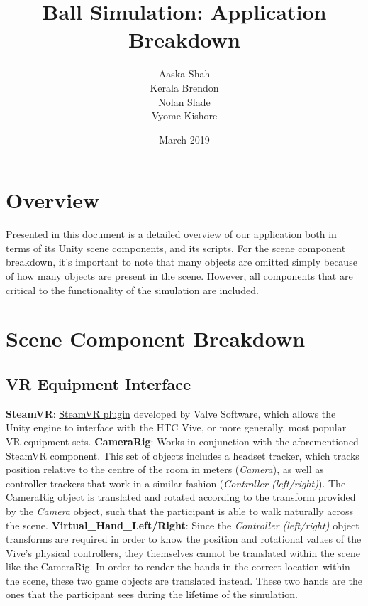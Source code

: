 \documentclass{article}
\title{Ball Simulation: Application Breakdown}
\author{Aaska Shah\\Kerala Brendon\\Nolan Slade\\Vyome Kishore}
\date{March 2019}
\begin{document}
\maketitle

\section*{Overview}
Presented in this document is a detailed overview of our application both in terms of its Unity scene components, and its scripts. For the scene component breakdown, it's important to note that many objects are omitted simply because of how many objects are present in the scene. However, all components that are critical to the functionality of the simulation are included.


\section*{Scene Component Breakdown}
\subsection*{VR Equipment Interface}
\textbf{SteamVR}: \href{https://bit.ly/2VnzLbI}{SteamVR plugin} developed by Valve Software, which allows the Unity engine to interface with the HTC Vive, or more generally, most popular VR equipment sets. \newline \newline
\textbf{CameraRig}: Works in conjunction with the aforementioned SteamVR component. This set of objects includes a headset tracker, which tracks position relative to the centre of the room in meters (\textit{Camera}), as well as controller trackers that work in a similar fashion (\textit{Controller (left\slash right)}). The CameraRig object is translated and rotated according to the transform provided by the \textit{Camera} object, such that the participant is able to walk naturally across the scene. \newline \newline
\textbf{Virtual\_Hand\_Left\slash Right}: Since the \textit{Controller (left\slash right)} object transforms are required in order to know the position and rotational values of the Vive's physical controllers, they themselves cannot be translated within the scene like the CameraRig. In order to render the hands in the correct location within the scene, these two game objects are translated instead. These two hands are the ones that the participant sees during the lifetime of the simulation. 
\end{document}
